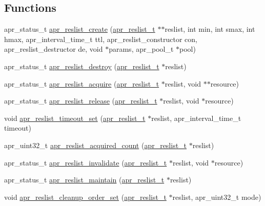\subsection*{Functions}
\begin{DoxyCompactItemize}
\item 
apr\-\_\-status\-\_\-t \hyperlink{group___a_p_r___util___r_l_ga608ebcddce542603a7f1d3cf51ae8d3c}{apr\-\_\-reslist\-\_\-create} (\hyperlink{group___a_p_r___util___r_l_ga670f6719dfeffe1037e063eaab7b82ac}{apr\-\_\-reslist\-\_\-t} $\ast$$\ast$reslist, int min, int smax, int hmax, apr\-\_\-interval\-\_\-time\-\_\-t ttl, apr\-\_\-reslist\-\_\-constructor con, apr\-\_\-reslist\-\_\-destructor de, void $\ast$params, apr\-\_\-pool\-\_\-t $\ast$pool)
\item 
apr\-\_\-status\-\_\-t \hyperlink{group___a_p_r___util___r_l_ga103e0cbac6c5da7cb93d4e52799233cb}{apr\-\_\-reslist\-\_\-destroy} (\hyperlink{group___a_p_r___util___r_l_ga670f6719dfeffe1037e063eaab7b82ac}{apr\-\_\-reslist\-\_\-t} $\ast$reslist)
\item 
apr\-\_\-status\-\_\-t \hyperlink{group___a_p_r___util___r_l_gadfbb592b31ff9215f45d3280636e41d7}{apr\-\_\-reslist\-\_\-acquire} (\hyperlink{group___a_p_r___util___r_l_ga670f6719dfeffe1037e063eaab7b82ac}{apr\-\_\-reslist\-\_\-t} $\ast$reslist, void $\ast$$\ast$resource)
\item 
apr\-\_\-status\-\_\-t \hyperlink{group___a_p_r___util___r_l_gaf65ca1701994a0323df639cdb4a8d8b2}{apr\-\_\-reslist\-\_\-release} (\hyperlink{group___a_p_r___util___r_l_ga670f6719dfeffe1037e063eaab7b82ac}{apr\-\_\-reslist\-\_\-t} $\ast$reslist, void $\ast$resource)
\item 
void \hyperlink{group___a_p_r___util___r_l_gafe06c964d04a568f2625fb5a9ba7bad6}{apr\-\_\-reslist\-\_\-timeout\-\_\-set} (\hyperlink{group___a_p_r___util___r_l_ga670f6719dfeffe1037e063eaab7b82ac}{apr\-\_\-reslist\-\_\-t} $\ast$reslist, apr\-\_\-interval\-\_\-time\-\_\-t timeout)
\item 
apr\-\_\-uint32\-\_\-t \hyperlink{group___a_p_r___util___r_l_gac37fbbcbc8a98ba9ed017638a2c6c1b7}{apr\-\_\-reslist\-\_\-acquired\-\_\-count} (\hyperlink{group___a_p_r___util___r_l_ga670f6719dfeffe1037e063eaab7b82ac}{apr\-\_\-reslist\-\_\-t} $\ast$reslist)
\item 
apr\-\_\-status\-\_\-t \hyperlink{group___a_p_r___util___r_l_ga346c0604115a9659cf23ed0cc781f7a9}{apr\-\_\-reslist\-\_\-invalidate} (\hyperlink{group___a_p_r___util___r_l_ga670f6719dfeffe1037e063eaab7b82ac}{apr\-\_\-reslist\-\_\-t} $\ast$reslist, void $\ast$resource)
\item 
apr\-\_\-status\-\_\-t \hyperlink{group___a_p_r___util___r_l_gaa13a7724a30b5a37ac13548bd8dc56f6}{apr\-\_\-reslist\-\_\-maintain} (\hyperlink{group___a_p_r___util___r_l_ga670f6719dfeffe1037e063eaab7b82ac}{apr\-\_\-reslist\-\_\-t} $\ast$reslist)
\item 
void \hyperlink{group___a_p_r___util___r_l_ga7e8adfc4b12ffb63c6795d8d79ee5e95}{apr\-\_\-reslist\-\_\-cleanup\-\_\-order\-\_\-set} (\hyperlink{group___a_p_r___util___r_l_ga670f6719dfeffe1037e063eaab7b82ac}{apr\-\_\-reslist\-\_\-t} $\ast$reslist, apr\-\_\-uint32\-\_\-t mode)
\end{DoxyCompactItemize}


